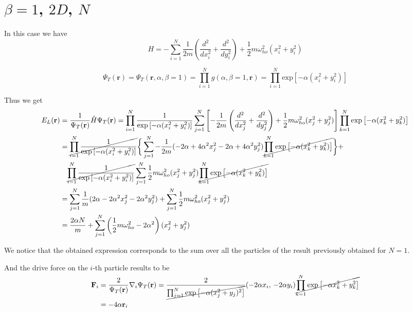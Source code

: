 \documentclass{article}
\begin{document}
\section{$\beta = 1$, $2D$, $N$}
In this case we have
\begin{equation*}
     H = -\sum_{i=1}^N \frac{1}{2m} \left( \frac{d^2}{dx_i^2} + \frac{d^2}{dy_i^2} \right) + \frac{1}{2} m \omega_{ho}^2 (x_i^2 + y_i^2)
\end{equation*}

\begin{equation*}
    \Psi_T(\mathbf{r})=\Psi_T(\mathbf{r},\alpha,\beta=1)
    = \prod_{i=1}^N g(\alpha,\beta=1,\mathbf{r}) = \prod_{i=1}^N \text{exp}\left[-\alpha (x_i^2 + y_i^2) \right]
\end{equation*}

Thus we get
\begin{align*}
    E_L(\mathbf{r}) &= \frac{1}{\Psi_T(\mathbf{r})} \hat{H} \Psi_T(\mathbf{r}) = \prod_{i=1}^N \frac{1}{\text{exp}\left[-\alpha (x_i^2 + y_i^2) \right]} \sum_{j=1}^N \left[ -\frac{1}{2m} \left( \frac{d^2}{dx_j^2} + \frac{d^2}{dy_j^2} \right) + \frac{1}{2} m \omega_{ho}^2 (x_j^2 + y_j^2) \right] \prod_{k=1}^N \text{exp}\left[-\alpha (x_k^2 + y_k^2) \right] \\
    &= \cancel{\prod_{i=1}^N \frac{1}{\text{exp}\left[-\alpha (x_i^2 + y_i^2) \right]} }
    \bigg\{ \sum_{j=1}^N -\frac{1}{2m}  (-2\alpha + 4 \alpha^2 x_j^2 - 2\alpha + 4\alpha^2 y_j^2)  \cancel{ \prod_{k=1}^N \text{exp}\left[-\alpha (x_k^2 + y_k^2) \right]} \bigg\} + \\
    &\quad \cancel{\prod_{i=1}^N \frac{1}{\text{exp}\left[-\alpha (x_i^2 + y_i^2) \right]}} \sum_{j=1}^N \frac{1}{2} m \omega_{ho}^2 (x_j^2 + y_j^2)  \cancel{\prod_{k=1}^N \text{exp}\left[-\alpha (x_k^2 + y_k^2) \right]} \\
    &= \sum_{j=1}^N \frac{1}{m}  ( 2\alpha - 2 \alpha^2 x_j^2 - 2\alpha^2 y_j^2) +  \sum_{j=1}^N \frac{1}{2} m \omega_{ho}^2 (x_j^2 + y_j^2) \\
    &= \frac{2\alpha N}{m} + \sum_{j=1}^{N} \left( \frac{1}{2} m \omega_{ho}^2 - 2\alpha^2 \right) (x_j^2 + y_j^2)
\end{align*}

We notice that the obtained expression corresponds to the sum over all the particles of the result previously obtained for $N=1$.

And the drive force on the $i$-th particle results to be
\begin{align*}
    \mathbf{F}_i &= \frac{2}{\Psi_T(\mathbf{r})} \nabla_i \Psi_T(\mathbf{r}) = \frac{2}{\cancel{\prod_{j=1}^N \text{exp}\left[-\alpha (x_j^2 + y_j)^2\right]}} (-2\alpha x_i,\, -2\alpha y_i) \cancel{\prod_{k=1}^N \text{exp}\left[-\alpha x_k^2 + y_k^2 \right]} \\
    &= -4\alpha \mathbf{r}_i
\end{align*}
\end{document}
